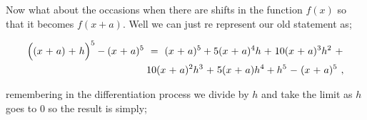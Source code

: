 \documentclass{article}
\begin{document}
Now what about the occasions when there are shifts in the function \begin{math} f(x) \end{math} so that it becomes \begin{math} f(x + a) \end{math}. Well we can just re represent our old statement as;

\begin{equation} \label{eq:320}
\begin{aligned}
\Big((x \hspace{0.025cm} + \hspace{0.025cm} a) \hspace{0.025cm} + \hspace{0.025cm} h\Big)^5 - (x \hspace{0.025cm} + \hspace{0.025cm} a)^5 \hspace{0.125cm} = \hspace{0.125cm} (x \hspace{0.025cm} + \hspace{0.025cm} a)^5 + 5(x \hspace{0.025cm} + \hspace{0.025cm} a)^4 h \hspace{0.025cm} + \hspace{0.025cm} 10(x \hspace{0.025cm} + \hspace{0.025cm} a)^3 h^2 \hspace{0.125cm} + \hspace{0.025cm} \\
10(x \hspace{0.025cm} + \hspace{0.025cm} a)^2 h^3 \hspace{0.025cm} + \hspace{0.025cm} 5(x \hspace{0.025cm} + \hspace{0.025cm} a)h^4 + h^5 \hspace{0.025cm} - \hspace{0.025cm} (x \hspace{0.025cm} + \hspace{0.025cm} a)^5 \hspace{0.125cm} ,
\end{aligned}
\end{equation}

remembering in the differentiation process we divide by \begin{math} h \end{math} and take the limit as \begin{math} h \end{math} goes to \begin{math} 0 \end{math} so the result is simply;
\end{document}
